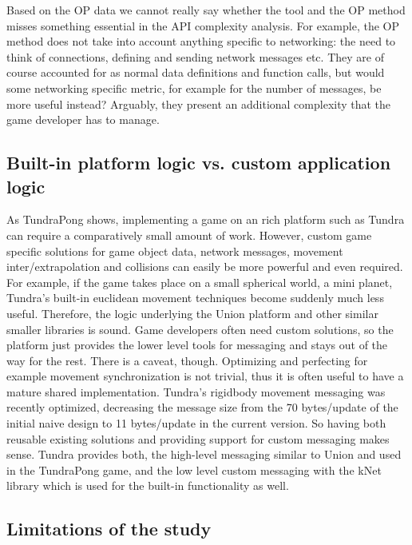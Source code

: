 \documentclass[conference]{IEEEtran}
\begin{document}
Based on the OP data we cannot really say whether the tool and the OP
method misses something essential in the API complexity analysis. For
example, the OP method does not take into account anything specific to
networking: the need to think of connections, defining and sending
network messages etc. They are of course accounted for as normal data
definitions and function calls, but would some networking specific
metric, for example for the number of messages, be more useful
instead? Arguably, they present an additional complexity that the game
developer has to manage.


\subsection{Built-in platform logic vs. custom application logic%
  \label{built-in-platform-logic-vs-custom-application-logic}%
}

As TundraPong shows, implementing a game on an rich platform such as
Tundra can require a comparatively small amount of work. However,
custom game specific solutions for game object data, network messages,
movement inter/extrapolation and collisions can easily be more
powerful and even required. For example, if the game takes place on a
small spherical world, a mini planet, Tundra’s built-in euclidean
movement techniques become suddenly much less useful. Therefore, the
logic underlying the Union platform and other similar smaller
libraries is sound. Game developers often need custom solutions, so
the platform just provides the lower level tools for messaging and
stays out of the way for the rest. There is a caveat,
though. Optimizing and perfecting for example movement synchronization
is not trivial, thus it is often useful to have a mature shared
implementation. Tundra’s rigidbody movement messaging was recently
optimized, decreasing the message size from the 70 bytes/update of the
initial naive design to 11 bytes/update in the current version. So
having both reusable existing solutions and providing support for
custom messaging makes sense. Tundra provides both, the high-level
messaging similar to Union and used in the TundraPong game, and the
low level custom messaging with the kNet library which is used for the
built-in functionality as well.


\subsection{Limitations of the study%
  \label{limitations-of-the-study}%
}
\end{document}
